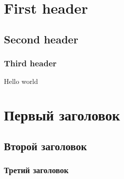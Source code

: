 \documentclass[a4paper, 14pt]{extarticle}
\begin{document}
	
\section{First header} %
\subsection{Second header} %
\subsubsection{Third header} %

Hello world



\section{Первый заголовок}
\subsection{Второй заголовок}
\subsubsection{Третий заголовок}
\end{document}
